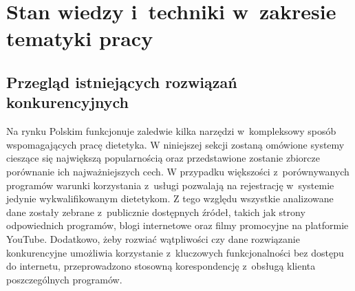 \chapter{Stan wiedzy i~techniki w~zakresie tematyki pracy}\label{ch:knowladge-state}
\section{Przegląd istniejących rozwiązań konkurencyjnych}\label{sec:competitive-solutions}
Na rynku Polskim funkcjonuje zaledwie kilka narzędzi w~kompleksowy sposób wspomagających pracę dietetyka.
W niniejszej sekcji zostaną omówione systemy cieszące się największą popularnością oraz przedstawione zostanie zbiorcze porównanie ich najważniejszych cech.
W przypadku większości z~porównywanych programów warunki korzystania z~usługi pozwalają na rejestrację w~systemie jedynie wykwalifikowanym dietetykom.
Z tego względu wszystkie analizowane dane zostały zebrane z~publicznie dostępnych źródeł,
takich jak strony odpowiednich programów, blogi internetowe oraz filmy promocyjne na platformie YouTube\cite{url:youtube}.
Dodatkowo, żeby rozwiać wątpliwości czy dane rozwiązanie konkurencyjne umożliwia korzystanie z~kluczowych funkcjonalności bez dostępu do internetu, przeprowadzono stosowną korespondencję z~obsługą klienta poszczególnych programów.
